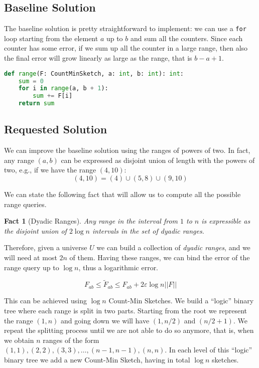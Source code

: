 \documentclass{article}
\newtheorem{fact}[theorem]{Fact}
\begin{document}
\subsection{Baseline Solution}

The baseline solution is pretty straightforward to implement: we can use a \verb+for+ loop starting from the element $a$ up to $b$ and sum
all the counters. Since each counter has some error, if we sum up all the counter in a large range,
then also the final error will grow linearly as large as the range, that is $b - a + 1$.

\begin{lstlisting}[language=Python,caption=`Range query for integer values']
def range(F: CountMinSketch, a: int, b: int): int:
    sum = 0
    for i in range(a, b + 1):
        sum += F[i]
    return sum
\end{lstlisting}

\subsection{Requested Solution}

\noindent We can improve the baseline solution using the ranges of powers of two. In fact, any range $(a, b)$ can be
expressed as disjoint union of length with the powers of two, e.g., if we have the range $(4, 10)$:
$$
(4, 10) = (4) \cup (5, 8) \cup (9, 10)
$$

\noindent We can state the following fact that will allow us to compute all the possible range queries.

\begin{fact}[Dyadic Ranges]
    Any range in the interval from $1$ to $n$ is expressible as the disjoint union of $2 \log n$ intervals 
    in the set of dyadic ranges.
\end{fact}

\noindent Therefore, given a universe $U$ we can build a collection of \textit{dyadic ranges}, and we will
need at most $2n$ of them. Having these ranges, we can bind the error of the range query up to $\log n$, thus a
logarithmic error.

\begin{equation*}
    F_{ab} \le \tilde{F}_{ab} \le F_{ab} + 2 \varepsilon \log{n} ||F||
\end{equation*}

\noindent This can be achieved using $\log n$ Count-Min Sketches. We build a ``logic'' binary tree where each range is split in two parts.
Starting from the root we represent the range $(1, n)$ and going down we will have $(1, n/2)$ and $(n/2 + 1)$. We repeat the splitting process
until we are not able to do so anymore, that is, when we obtain $n$ ranges of the form $(1,1), (2, 2), (3, 3), \dots, (n-1, n-1), (n, n)$.
In each level of this ``logic'' binary tree we add a new Count-Min Sketch, having in total $\log n$ sketches.
\end{document}
